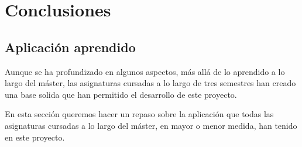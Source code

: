 \chapter{Conclusiones}
\label{chapter:conclusiones}

\section{Aplicación aprendido}

Aunque se ha profundizado en algunos aspectos, más allá de lo aprendido a lo largo del máster, las asignaturas cursadas a lo largo de tres semestres han creado una base solida que han permitido el desarrollo de este proyecto.

En esta sección queremos hacer un repaso sobre la aplicación que todas las asignaturas cursadas a lo largo del máster, en mayor o menor medida, han tenido en este proyecto. 

